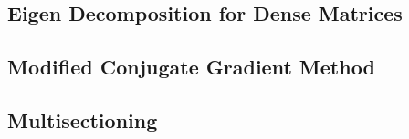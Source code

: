 \label{sec:implementation}
\subsection{Eigen Decomposition for Dense Matrices}

\subsection{Modified Conjugate Gradient Method}

\subsection{Multisectioning}
